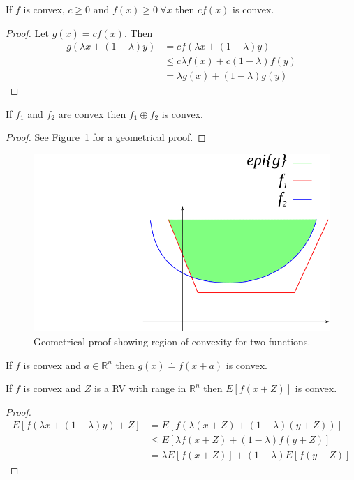 \begin{theorem}
\label{th:cfxconvex}
If $f$ is convex, $c\geq 0$ and $f(x)\geq 0~\forall x$ then $cf(x)$ is convex.
\end{theorem}

\begin{proof}
Let $g(x)=cf(x)$.
Then
\begin{align*}
g(\lambda x+(1-\lambda)y) &= cf(\lambda x+(1-\lambda)y) \\
&\leq c\lambda f(x) + c(1-\lambda)f(y) \\
&= \lambda g(x) + (1-\lambda)g(y)
\end{align*}
\end{proof}

\begin{theorem}
\label{th:maxconvex}
If $f_1$ and $f_2$ are convex then $f_1\oplus f_2$ is convex.
\end{theorem}

\begin{proof}
See Figure~\ref{fig:05convexOplusProof} for a geometrical proof.
\end{proof}

\begin{figure}[ht!]
\centering
\includegraphics[width=.4\textwidth]{images/05convexOplusProof}
\caption{Geometrical proof showing region of convexity for two functions.}
\label{fig:05convexOplusProof}
\end{figure}

\begin{theorem}
\label{th:argconvex}
If $f$ is convex and $a\in\mathbb{R}^n$ then $g(x)\doteq f(x+a)$ is convex.
\end{theorem}

\begin{theorem}
\label{th:randconvex}
If $f$ is convex and $Z$ is a RV with range in $\mathbb{R}^n$ then $E[f(x+Z)]$ is convex.
\end{theorem}

\begin{proof}
\begin{align*}
E[f(\lambda x+(1-\lambda)y) + Z] &= E[f(\lambda(x+Z) + (1-\lambda)(y+Z))] \\
&\leq E[\lambda f(x+Z) + (1-\lambda)f(y+Z)] \\
&= \lambda E[f(x+Z)] + (1-\lambda)E[f(y+Z)]
\end{align*}
\end{proof}

